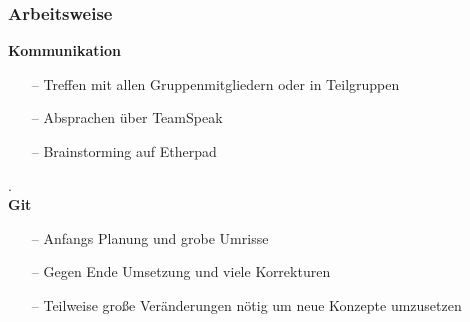 \documentclass[aspectratio=1610]{beamer}
\begin{document}
\begin{frame}[plain]
\frametitle{Arbeitsweise}
\begin{minipage}{0.5\textwidth}
	\setlength{\fboxsep}{0pt}%
	\setlength{\fboxrule}{1pt}%
	\captionsetup{labelformat=empty}
	\centering
\end{minipage}%
\begin{minipage}{0.5\textwidth}
	\textbf{Kommunikation}
	\begin{itemize}
		\setlength\itemsep{0.3em}
		\item[--] Treffen mit allen Gruppenmitgliedern oder in Teilgruppen
		\item[--] Absprachen über TeamSpeak
		\item[--] Brainstorming auf Etherpad
	\end{itemize}
	.\\ \textbf{Git}
	\begin{itemize}
		\setlength\itemsep{0.3em}
		\item[--] Anfangs Planung und grobe Umrisse
		\item[--] Gegen Ende Umsetzung und viele Korrekturen
		\item[--] Teilweise große Veränderungen nötig um neue Konzepte umzusetzen
	\end{itemize}
\end{minipage}
\end{frame}
\end{document}
